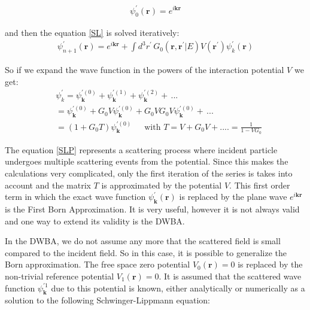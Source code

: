 \begin{equation}
\begin{split}
\psi^{'}_0(\mathbf{r}) = e^{i\mathbf{k}\mathbf{r}}
\end{split}
\end{equation}

and then the equation \eqref{SL} is solved iteratively:
\begin{equation}\label{SLi}
\begin{split}
\psi^{'}_{n+1}(\mathbf{r}) = e^{i\mathbf{k}\mathbf{r}} + \int{d^3r^{'}\,G_0(\mathbf{r}, \mathbf{r}^{'}| E)V(\mathbf{r}^{'})\psi^{'}_k(\mathbf{r}) }
\end{split}
\end{equation}

So if we expand the wave function in the powers of the interaction potential $ V $ we get:
\begin{equation}\label{SLP}
\begin{split}
& \psi^{'}_k = \psi^{'(0)}_{\mathbf{k}} + \psi^{'(1)}_{\mathbf{k}} +  \psi^{'(2)}_{\mathbf{k}} +\, ...\, \\[.8em]
& = \psi^{'(0)}_{\mathbf{k}} + G_0V\psi^{'(0)}_{\mathbf{k}} + G_0VG_0V\psi^{'(0)}_{\mathbf{k}} + \,...\, \\[.8em]
& = (1 + G_0T)\psi^{'(0)}_{\mathbf{k}}\,\,\,\,\,\,\,\text{ with } T = V + G_0V + .... = \frac{1}{1-VG_0}
\end{split}
\end{equation}

The equation \eqref{SLP} represents a scattering process where incident particle undergoes multiple scattering events from the potential. Since this makes the calculations very complicated, only the first iteration of the series is takes into account and the matrix $ T $ is approximated by the potential $ V $. This first order term in which the exact wave function $ \psi^{'}_{\mathbf{k}}(\mathbf{r}) $ is replaced by the plane wave $ e^{i\mathbf{k}\mathbf{r}} $ is the First Born Approximation. It is very useful, however it is not always valid and one way to extend its validity is the DWBA. 

In the DWBA, we do not assume any more that the scattered field is small compared to the incident field. So in this case, it is possible to generalize the Born approximation. The free space zero potential $ V_0(\mathbf{r}) = 0 $ is replaced by the non-trivial reference potential $ V_1(\mathbf{r}) = 0 $. It is assumed that the scattered wave function $ \psi_{\mathbf{k}}^{'1} $ due to this potential is known, either analytically or numerically as a solution to the following Schwinger-Lippmann equation:

